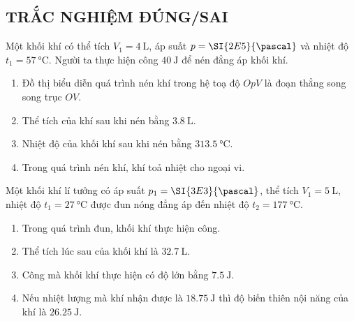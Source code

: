\subsection{TRẮC NGHIỆM ĐÚNG/SAI}
\setcounter{ex}{0}
\begin{ex}
	Một khối khí có thể tích $V_1=\SI{4}{\liter}$, áp suất $p=\SI{2E5}{\pascal}$ và nhiệt độ $t_1=\SI{57}{\celsius}$. Người ta thực hiện công $\SI{40}{\joule}$ để nén đẳng áp khối khí.
	\begin{enumerate}[label=\alph*)]
		\item Đồ thị biểu diễn quá trình nén khí trong hệ toạ độ $OpV$ là đoạn thẳng song song trục $OV$.
		\item Thể tích của khí sau khi nén bằng $\SI{3.8}{\liter}$.
		\item Nhiệt độ của khối khí sau khi nén bằng $\SI{313.5}{\celsius}$.
		\item Trong quá trình nén khí, khí toả nhiệt cho ngoại vi.
	\end{enumerate}
\end{ex}
\begin{ex}
	Một khối khí lí tưởng có áp suất $p_1=\SI{3E3}{\pascal}$, thể tích $V_1=\SI{5}{\liter}$, nhiệt độ $t_1=\SI{27}{\celsius}$ được đun nóng đẳng áp đến nhiệt độ $t_2=\SI{177}{\celsius}$.
	\begin{enumerate}[label=\alph*)]
		\item Trong quá trình đun, khối khí thực hiện công.
		\item Thể tích lúc sau của khối khí là $\SI{32.7}{\liter}$.
		\item Công mà khối khí thực hiện có độ lớn bằng $\SI{7.5}{\joule}$.
		\item Nếu nhiệt lượng mà khí nhận được là $\SI{18.75}{\joule}$ thì độ biến thiên nội năng của khí là $\SI{26.25}{\joule}$. 
	\end{enumerate}
	
\end{ex}
